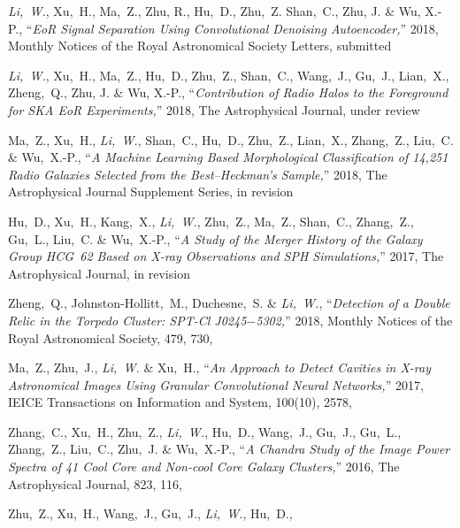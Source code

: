 
\begin{publications}{99}
  \item \emph{Li,~W.}, Xu,~H., Ma,~Z., Zhu, R., Hu,~D., Zhu,~Z.
    Shan,~C., Zhu, J. \& Wu, X.-P.,
    \enquote{\it EoR Signal Separation Using Convolutional Denoising
      Autoencoder,}
    2018, Monthly Notices of the Royal Astronomical Society Letters,
    submitted
  \item \emph{Li,~W.}, Xu,~H., Ma,~Z., Hu,~D., Zhu,~Z., Shan,~C.,
    Wang,~J., Gu,~J., Lian,~X., Zheng,~Q., Zhu, J. \& Wu, X.-P.,
    \enquote{\it Contribution of Radio Halos to the Foreground for
      SKA EoR Experiments,}
    2018, The Astrophysical Journal,
    under review
  \item Ma,~Z., Xu,~H., \emph{Li,~W.}, Shan,~C., Hu,~D., Zhu,~Z.,
    Lian,~X., Zhang,~Z., Liu,~C. \& Wu,~X.-P.,
    \enquote{\it A Machine Learning Based Morphological Classification
      of 14,251 Radio Galaxies Selected from the Best--Heckman's Sample,}
    2018, The Astrophysical Journal Supplement Series,
    in revision
  \item Hu,~D., Xu,~H., Kang,~X., \emph{Li,~W.}, Zhu,~Z., Ma,~Z.,
    Shan,~C., Zhang,~Z., Gu,~L., Liu,~C. \& Wu,~X.-P.,
    \enquote{\it A Study of the Merger History of the Galaxy Group
      HCG~62 Based on X-ray Observations and SPH Simulations,}
    2017, The Astrophysical Journal,
    in revision
  \item Zheng,~Q., Johnston-Hollitt,~M., Duchesne,~S. \& \emph{Li,~W.},
    \enquote{\it Detection of a Double Relic in the Torpedo Cluster:
      SPT-Cl J0245$-$5302,}
    2018, Monthly Notices of the Royal Astronomical Society, 479, 730,
  \item Ma,~Z., Zhu,~J., \emph{Li,~W.} \& Xu,~H.,
    \enquote{\it An Approach to Detect Cavities in X-ray Astronomical
      Images Using Granular Convolutional Neural Networks,}
    2017, IEICE Transactions on Information and System, 100(10), 2578,
  \item Zhang,~C., Xu,~H., Zhu,~Z., \emph{Li,~W.}, Hu,~D., Wang,~J.,
    Gu,~J., Gu,~L., Zhang,~Z., Liu,~C., Zhu,~J. \& Wu,~X.-P.,
    \enquote{\it A Chandra Study of the Image Power Spectra of 41
      Cool Core and Non-cool Core Galaxy Clusters,}
    2016, The Astrophysical Journal, 823, 116,
  \item Zhu,~Z., Xu,~H., Wang,~J., Gu,~J., \emph{Li,~W.}, Hu,~D.,

\end{publications}
